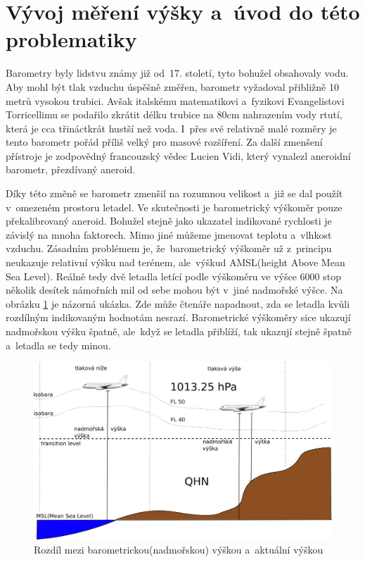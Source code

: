 		
	\section{Vývoj měření výšky a~úvod do této problematiky}
	
		Barometry byly lidstvu známy již od~17. století, tyto bohužel obsahovaly vodu. Aby mohl být tlak vzduchu úspěšně změřen, barometr vyžadoval přibližně 10 metrů vysokou trubici. Avšak italskému matematikovi a~fyzikovi Evangelistovi Torricellimu se podařilo zkrátit délku trubice na 80cm nahrazením vody rtutí, která je cca třináctkrát hustší než voda. I~přes své relativně malé rozměry je tento barometr pořád příliš velký pro masové rozšíření. Za další zmenšení přístroje je zodpovědný francouzský vědec Lucien Vidi, který vynalezl aneroidní barometr, přezdívaný aneroid\cite{history::aneroid}.\par
		Díky této změně se barometr zmenšil na rozumnou velikost a~již se dal použít v~omezeném prostoru letadel. Ve skutečnosti je barometrický výškoměr pouze překalibrovaný aneroid. Bohužel stejně jako ukazatel indikované rychlosti je závislý na mnoha faktorech. Mimo jiné můžeme jmenovat teplotu a~vlhkost vzduchu. Zásadním problémem je, že~barometrický výškoměr už z~principu neukazuje relativní výšku nad terénem, ale~výškud AMSL(height Above Mean Sea Level). Reálně tedy dvě letadla letící podle výškoměru ve výšce 6000 stop několik desítek námořních mil od sebe mohou být v~jiné nadmořské výšce. Na obrázku \ref{historie::vyvojMereniVysky::FL} je názorná ukázka. Zde může čtenáře napadnout, zda se letadla kvůli rozdílným indikovaným hodnotám nesrazí. Barometrické výškoměry sice ukazují nadmořskou výšku špatně, ale~když se letadla přiblíží, tak ukazují stejně špatně a~letadla se tedy minou.\par
		
		\begin{figure}[H]
			\begin{center}
				\includegraphics[scale=0.75]{obrazky-figures/flight_level.png}
				\caption{Rozdíl mezi barometrickou(nadmořskou) výškou a~aktuální výškou}\label{historie::vyvojMereniVysky::FL}
			\end{center}
		\end{figure}
				
